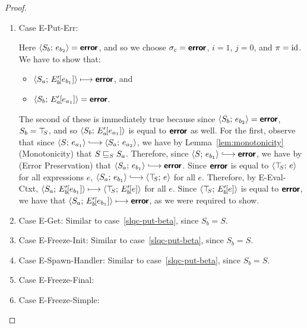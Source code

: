 \begin{proof}
\begin{enumerate}
\begin{enumerate}
\begin{itemize}
      \end{itemize}

    \item \label{slqc-put-put-err}Case {\sc E-Put-Err}:

      Here $\langle S_b;\, e_{b_2} \rangle = \textbf{\textsf{error}}$, and so we choose $\sigma_c
      = \textbf{\textsf{error}}$, $i = 1$, $j = 0$, and $\pi = \mathrm{id}$.  We have to show that:
      \begin{itemize}
      \item $\langle S_a;\, E'_b\hspace{-1mm}\left[e_{b_1}\right] \rangle \longmapsto
        \textbf{\textsf{error}}$, and
      \item
        $\langle S_b;\, E'_a\hspace{-1mm}\left[e_{a_1}\right] \rangle = \textbf{\textsf{error}}$.
      \end{itemize}

      The second of these is immediately true because since
      $\langle S_b;\, e_{b_2} \rangle = \textbf{\textsf{error}}$, $S_b = \top\hspace{-0.85mm}_{S}$, and so
      $\langle S_b;\, E'_a\hspace{-1mm}\left[e_{a_1}\right] \rangle$ is equal to $\textbf{\textsf{error}}$ as
      well.  For the first, observe that since $\config{S}{e_{a_1}}
      \parstepsto \config{S_a}{e_{a_2}}$, we have by
      Lemma~\ref{lem:monotonicity} (Monotonicity) that
      $S \sqsubseteq_S S_a$.  Therefore, since $\config{S}{e_{b_1}}
      \parstepsto \error$, we have by
      (Error Preservation)
      that $\config{S_a}{e_{b_1}} \parstepsto \error$.  Since $\textbf{\textsf{error}}$
      is equal to $\langle \top\hspace{-0.85mm}_{S};\, e \rangle$ for all expressions $e$,
      $\config{S_a}{e_{b_1}} \parstepsto \config{\topS}{e}$ for all
      $e$.  Therefore, by {\sc E-Eval-Ctxt},
      $\langle S_a;\, E'_b\hspace{-1mm}\left[e_{b_1}\right] \rangle \longmapsto
      \langle \top\hspace{-0.85mm}_{S};\, E'_b\hspace{-1mm}\left[e\right] \rangle$ for all $e$.  Since
      $\langle \top\hspace{-0.85mm}_{S};\, E'_b\hspace{-1mm}\left[e\right] \rangle$ is equal to $\textbf{\textsf{error}}$, we
      have that $\langle S_a;\, E'_b\hspace{-1mm}\left[e_{b_1}\right] \rangle \longmapsto
      \textbf{\textsf{error}}$, as we were required to show.

    \item \label{slqc-put-get}Case {\sc E-Get}: Similar to
      case~\ref{slqc-put-beta}, since $S_b = S$.
    \item \label{slqc-put-freeze-init}Case {\sc E-Freeze-Init}:
      Similar to case~\ref{slqc-put-beta}, since $S_b = S$.
    \item \label{slqc-put-spawn-handler}Case {\sc E-Spawn-Handler}:
      Similar to case~\ref{slqc-put-beta}, since $S_b = S$.
    \item \label{slqc-put-freeze-final}Case {\sc E-Freeze-Final}: \TODO{}
    \item \label{slqc-put-freeze-simple}Case {\sc E-Freeze-Simple}: \TODO{}


\end{enumerate}
\end{enumerate}
\end{proof}
